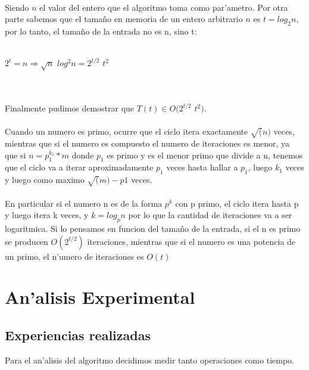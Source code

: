 \paragraph{}
Siendo $n$ el valor del entero que el algoritmo toma como par'ametro. Por otra parte sabemos que 
el tama\~{n}o en memoria de un entero arbitrario $n$ es $t = log_2 n$, por lo tanto, el tama\~{n}o de la entrada no es n, sino t:\\
\\
\centerline{$2^t = n \Rightarrow \sqrt{n}$ $log^2 n = 2^{t/2}$ $t^2$}
\\
\paragraph{}
Finalmente pudimos demostrar que $T(t) \in O(2^{t/2} $ $t^2)$.
\paragraph{}
Cuando un numero es primo, ocurre que el ciclo itera exactamente $\sqrt(n)$ veces, mientras que si el numero es compuesto el numero de iteraciones es menor, ya que si $n = p_{1}^{k_{1}}*m$ donde $p_1$ es primo y es el menor primo que divide a n, tenemos que el ciclo va a iterar aproximadamente $p_1$ veces hasta hallar a $p_1$, luego $k_1$ veces y luego como maximo $\sqrt(m)-p1$ veces. 
\paragraph{}
En particular si el numero n es de la forma $p^k$ con p primo, el ciclo itera hasta p y luego itera k veces, y $k=log_p n$ por lo que la cantidad de iteraciones va a ser logaritmica. Si lo pensamos en funcion del tama\~{n}o de la entrada, si el n es primo se producen $O(2^{t/2})$ iteraciones, mientras que si el numero es una potencia de un primo, el n'umero de iteraciones es $O(t)$


\newpage
\section{An'alisis Experimental}
\subsection{Experiencias realizadas}
Para el an'alisis del algoritmo decidimos medir tanto operaciones como tiempo. 

